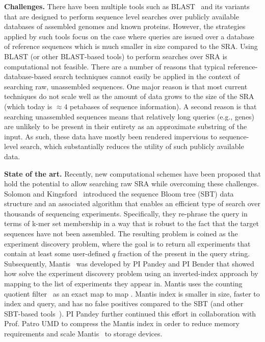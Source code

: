 \noindent
{\bf Challenges.}
There have been multiple tools such as BLAST~\cite{altschul1990basic} and its variants that are designed to perform sequence level searches over publicly available databases of assembled genomes and known proteins. %
However, the strategies applied by such tools focus on the case where queries are issued over a database of reference sequences which is much smaller in size compared to the SRA. 
Using BLAST (or other BLAST-based tools) to perform searches over SRA is computational not feasible.
%
There are a number of reasons that typical reference-database-based search techniques cannot easily be applied in the context of searching raw, unassembled sequences. One major reason is that most current techniques do not scale well as the amount of data grows to the size of the SRA (which today is $\approx4$ petabases of sequence information). A second reason is that searching unassembled sequences means that relatively long queries (e.g., genes) are unlikely to be present in their entirety as an approximate substring of the input.
As such, these data have mostly been rendered impervious to sequence-level search, which substantially reduces the utility of such publicly available data.


\noindent
{\bf State of the art.}
Recently, new computational schemes have been proposed that hold the potential to allow searching raw SRA while overcoming these challenges. Solomon and Kingsford~\cite{solomon2016fast} introduced the sequence Bloom tree (SBT) data structure and an associated algorithm that enables an efficient type of search over thousands of sequencing experiments. Specifically, they re-phrase the query in terms of k-mer set membership in a way that is robust to the fact that the target sequences have not been assembled. The resulting problem is coined as the experiment discovery problem, where the goal is to return all experiments that contain at least some user-defined $q$ fraction of the \kmers present in the query string.
%
Subsequently, Mantis~\cite{PandeyABFJP18Cell} was developed by PI Pandey and PI Bender that showed how solve the experiment discovery problem using an inverted-index approach by mapping \kmers to the list of experiments they appear in. Mantis uses the counting quotient filter~\cite{PandeyBJP17} as an exact map to map \kmers. Mantis index is smaller in size, faster to index and query, and has no false positives compared to the SBT (and other SBT-based tools~\cite{SolomonK17,HarrisM20,BingmannBGI19}).
%
PI Pandey further continued this effort in collaboration with Prof. Patro UMD to compress the Mantis index in order to reduce memory requirements and scale Mantis~\cite{AlmodaresiPFJP19,AlmodaresiPFJP20} to storage devices.


